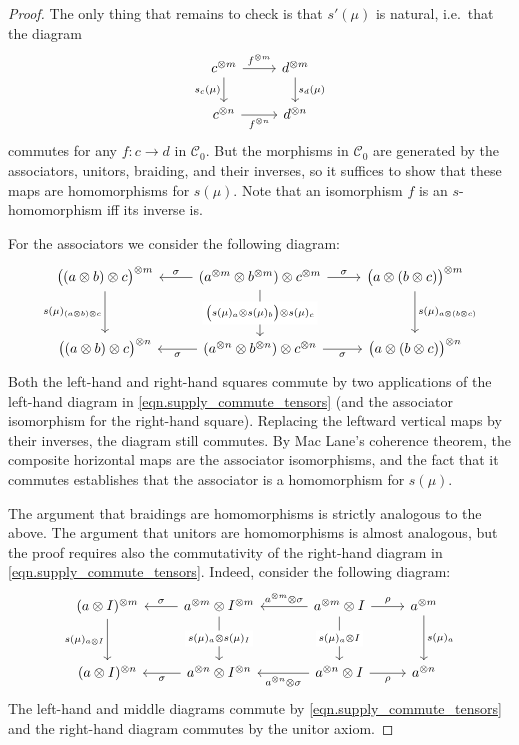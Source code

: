 \documentclass[11pt, oneside, article]{memoir}
\theoremstyle{plain}
\theoremstyle{definition}
\theoremstyle{remark}
\newcommand{\cat}[1]{\mathcal{#1}}%
\newcommand{\tpow}[1]{^{\otimes #1}}
\newcommand{\mob}[1]{#1_0}
\begin{document}
\begin{proof}
 The only thing that remains to check is that $s'(\mu)$ is natural, i.e.\ that the diagram
 \begin{equation}\label{eqn.C_0_homos}
 \begin{tikzcd}
	c\tpow{m}\ar[d, "s_c(\mu)"']\ar[r, "f\tpow{m}"]&
	d\tpow{m}\ar[d, "s_d(\mu)"]\\
	c\tpow{n}\ar[r, "f\tpow{n}"']&
	d\tpow{n}
\end{tikzcd}
\end{equation}
commutes for any $f\colon c\to d$ in $\mob{\cat{C}}$. But the morphisms in $\mob{\cat{C}}$ are generated by the associators, unitors, braiding, and their inverses, so it suffices to show that these maps are homomorphisms for $s(\mu)$. Note that an isomorphism $f$ is an $s$-homomorphism iff its inverse is.

For the associators we consider the following diagram:
\[
\begin{tikzcd}[row sep=30pt]
  \big((a\otimes b)\otimes c\big)\tpow{m}\ar[d, "s(\mu)_{(a\otimes b)\otimes c}"']&
  (a\tpow{m}\otimes b\tpow{m})\otimes c\tpow{m}\ar[l, "\sigma"']\ar[r, "\sigma"]\ar[d, "\big(s(\mu)_a\otimes s(\mu)_b\big)\otimes s(\mu)_c" description]&
  \big(a\otimes (b\otimes c)\big)\tpow{m}\ar[d, "s(\mu)_{a\otimes (b\otimes c)}"]\\
  \big((a\otimes b)\otimes c\big)\tpow{n}&
  (a\tpow{n}\otimes b\tpow{n})\otimes c\tpow{n}\ar[l, "\sigma"]\ar[r, "\sigma"']&
  \big(a\otimes (b\otimes c)\big)\tpow{n}
\end{tikzcd}
\]
Both the left-hand and right-hand squares commute by two applications of the left-hand diagram in \cref{eqn.supply_commute_tensors} (and the associator isomorphism for the right-hand square). Replacing the leftward vertical maps by their inverses, the diagram still commutes. By Mac Lane's coherence theorem, the composite horizontal maps are the associator isomorphisms, and the fact that it commutes establishes that the associator is a homomorphism for $s(\mu)$.

The argument that braidings are homomorphisms is strictly analogous to the above. The argument that unitors are homomorphisms is almost analogous, but the proof requires also the commutativity of the right-hand diagram in \cref{eqn.supply_commute_tensors}. Indeed, consider the following diagram:
\[
\begin{tikzcd}[row sep=30pt]
	(a\otimes I)\tpow{m}\ar[d, "s(\mu)_{a\otimes I}"']&
	a\tpow{m}\otimes I\tpow{m}\ar[d, "s(\mu)_a\otimes s(\mu)_I" description]\ar[l, "\sigma"']&[10pt]
	a\tpow{m}\otimes I\ar[d, "s(\mu)_a\otimes I" description]\ar[r, "\rho"]\ar[l, "a\tpow{m}\otimes\sigma"']&
	a\tpow{m}\ar[d, "s(\mu)_a"]\\
	(a\otimes I)\tpow{n}&
	a\tpow{n}\otimes I\tpow{n}\ar[l, "\sigma"]&
	a\tpow{n}\otimes I\ar[l, "a\tpow{n}\otimes\sigma"]\ar[r, "\rho"']&
	a\tpow{n}
\end{tikzcd}
\]
The left-hand and middle diagrams commute by \cref{eqn.supply_commute_tensors} and the right-hand diagram commutes by the unitor axiom.
\end{proof}
\end{document}
